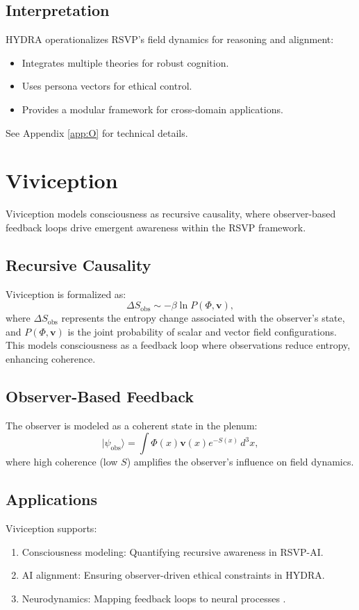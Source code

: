 \documentclass[12pt]{report}
\begin{document}
\section{Interpretation}
HYDRA operationalizes RSVP’s field dynamics for reasoning and alignment:
\begin{itemize}
    \item Integrates multiple theories for robust cognition.
    \item Uses persona vectors for ethical control.
    \item Provides a modular framework for cross-domain applications.
\end{itemize}
See Appendix \ref{app:O} for technical details.

\chapter{Viviception}
\label{chap:viviception}
Viviception models consciousness as recursive causality, where observer-based feedback loops drive emergent awareness within the RSVP framework.

\section{Recursive Causality}
Viviception is formalized as:
\begin{equation}
\Delta S_{\text{obs}} \sim -\beta \ln P(\Phi, \mathbf{v}), \label{eq:viviception}
\end{equation}
where \(\Delta S_{\text{obs}}\) represents the entropy change associated with the observer’s state, and \(P(\Phi, \mathbf{v})\) is the joint probability of scalar and vector field configurations. This models consciousness as a feedback loop where observations reduce entropy, enhancing coherence.

\section{Observer-Based Feedback}
The observer is modeled as a coherent state in the plenum:
\[
|\psi_{\text{obs}}\rangle = \int \Phi(x) \mathbf{v}(x) e^{-S(x)} \, d^3x,
\]
where high coherence (low \(S\)) amplifies the observer’s influence on field dynamics.

\section{Applications}
Viviception supports:
\begin{enumerate}
    \item Consciousness modeling: Quantifying recursive awareness in RSVP-AI.
    \item AI alignment: Ensuring observer-driven ethical constraints in HYDRA.
    \item Neurodynamics: Mapping feedback loops to neural processes \citep{Friston2010}.
\end{enumerate}
\end{document}
